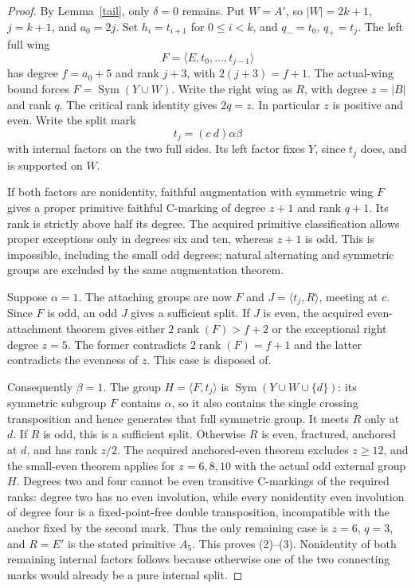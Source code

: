 \documentclass[11pt,a4paper]{article}
\newcommand{\gen}[1]{\langle#1\rangle}
\newcommand{\Sym}{\operatorname{Sym}}
\begin{document}
\begin{proof}
By Lemma~\ref{tail}, only $\delta=0$ remains. Put $W=A'$,
so $|W|=2k+1$, $j=k+1$, and $a_0=2j$.
Set $h_i=t_{i+1}$ for $0\le i<k$, and $q_-=t_0$, $q_+=t_j$.
The left full wing
\[
 F=\gen{E,t_0,\ldots,t_{j-1}}
\]
has degree $f=a_0+5$ and rank $j+3$, with $2(j+3)=f+1$.
The actual-wing bound forces $F=\Sym(Y\cup W)$.
Write the right wing as $R$, with degree $z=|B|$ and rank $q$.
The critical rank identity gives $2q=z$. In particular $z$ is
positive and even. Write the split mark
\[
                  t_j=(c\ d)\alpha\beta
\]
with internal factors on the two full sides. Its left factor
fixes $Y$, since $t_j$ does, and is supported on $W$.

If both factors are nonidentity, faithful augmentation with
symmetric wing $F$ gives a proper primitive faithful C-marking
of degree $z+1$ and rank $q+1$. Its rank is strictly above half
its degree. The acquired primitive classification allows proper
exceptions only in degrees six and ten, whereas $z+1$ is odd.
This is impossible, including the small odd degrees; natural
alternating and symmetric groups are excluded by the same
augmentation theorem.

Suppose $\alpha=1$. The attaching groups are now $F$ and
$J=\gen{t_j,R}$, meeting at $c$. Since $F$ is odd, an odd
$J$ gives a sufficient split. If $J$ is even, the acquired
even-attachment theorem gives either $2\operatorname{rank}(F)>f+2$
or the exceptional right degree $z=5$. The former contradicts
$2\operatorname{rank}(F)=f+1$ and the latter contradicts the
evenness of $z$. This case is disposed of.

Consequently $\beta=1$. The group $H=\gen{F,t_j}$ is
$\Sym(Y\cup W\cup\{d\})$: its symmetric subgroup $F$
contains $\alpha$, so it also contains the single crossing
transposition and hence generates that full symmetric group.
It meets $R$ only at $d$. If $R$ is odd, this is a sufficient
split. Otherwise $R$ is even, fractured, anchored at $d$, and
has rank $z/2$. The acquired anchored-even theorem excludes
$z\ge12$, and the small-even theorem applies for $z=6,8,10$
with the actual odd external group $H$. Degrees two and four
cannot be even transitive C-markings of the required ranks:
degree two has no even involution, while every nonidentity even involution of degree four is a
fixed-point-free double transposition, incompatible with the anchor
fixed by the second mark. Thus the only
remaining case is $z=6$, $q=3$, and $R=E'$ is the stated
primitive $A_5$. This proves (2)--(3). Nonidentity of both
remaining internal factors follows because otherwise one of
the two connecting marks would already be a pure internal split.


\end{proof}
\end{document}
